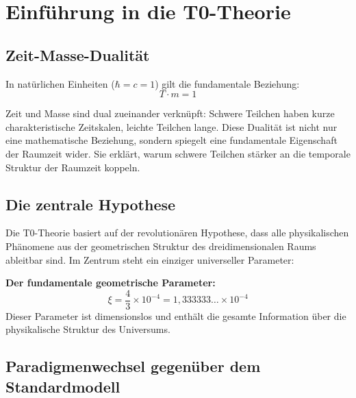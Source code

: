 	
	\section{Einführung in die T0-Theorie}
	
	\subsection{Zeit-Masse-Dualität}
	
	In natürlichen Einheiten ($\hbar = c = 1$) gilt die fundamentale Beziehung:
	\begin{equation}
		T \cdot m = 1
		\label{eq:time_mass_duality}
	\end{equation}
	
	Zeit und Masse sind dual zueinander verknüpft: Schwere Teilchen haben kurze charakteristische Zeitskalen, leichte Teilchen lange. Diese Dualität ist nicht nur eine mathematische Beziehung, sondern spiegelt eine fundamentale Eigenschaft der Raumzeit wider. Sie erklärt, warum schwere Teilchen stärker an die temporale Struktur der Raumzeit koppeln.
	
	\subsection{Die zentrale Hypothese}
	
	Die T0-Theorie basiert auf der revolutionären Hypothese, dass alle physikalischen Phänomene aus der geometrischen Struktur des dreidimensionalen Raums ableitbar sind. Im Zentrum steht ein einziger universeller Parameter:
	
	\begin{foundation}
		\textbf{Der fundamentale geometrische Parameter:}
		\begin{equation}
			\boxed{\xi = \frac{4}{3} \times 10^{-4} = 1{,}333333\dots \times 10^{-4}}
			\label{eq:xi_fundamental}
		\end{equation}
		Dieser Parameter ist dimensionslos und enthält die gesamte Information über die physikalische Struktur des Universums.
	\end{foundation}
	
	\subsection{Paradigmenwechsel gegenüber dem Standardmodell}
	
